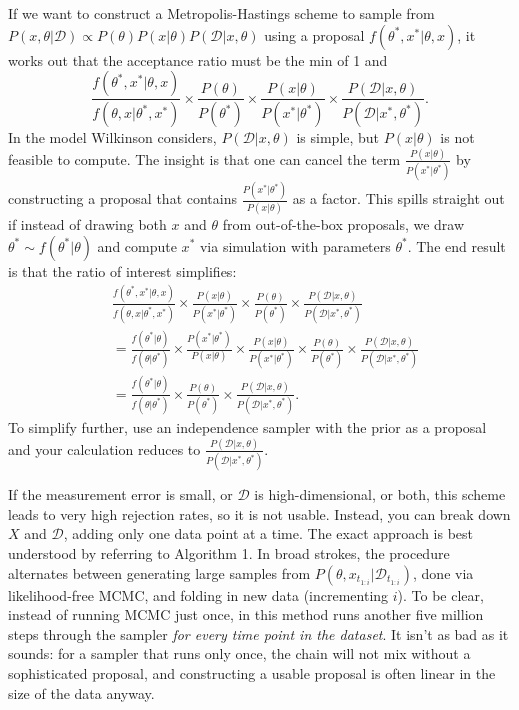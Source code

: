 \documentclass{article}
\begin{document}
If we want to construct a Metropolis-Hastings scheme to sample from $P(x, \theta|\mathcal{D})\propto P( \theta)P(x| \theta)P(\mathcal{D}|x, \theta)$ using a proposal $f(\theta^*, x^*|\theta, x)$, it works out that the acceptance ratio must be the min of 1 and $$\frac{f(\theta^*, x^*|\theta, x)}{f(\theta, x|\theta^*, x^*)}\times 
\frac{ P( \theta)}{ P( \theta^*)} \times 
\frac{P(x| \theta)}{P(x^*| \theta^*)} \times
 \frac{P(\mathcal{D}|x, \theta)}{P(\mathcal{D}|x^*, \theta^*)}.$$ 
In the model Wilkinson considers, $P(\mathcal{D}|x,\theta)$ is simple, but $P(x|\theta)$ is not feasible to compute. The insight is that one can cancel the term $ \frac{P(x| \theta)}{P(x^*| \theta^*)}$ by constructing a proposal that contains  $\frac{P(x^*| \theta^*)}{P(x| \theta)}$ as a factor. This spills straight out if instead of drawing both $x$ and $\theta$ from out-of-the-box proposals, we draw $\theta^*\sim f(\theta^*|\theta)$ and compute $x^*$ via simulation with parameters $\theta^*$. The end result is that the ratio of interest simplifies:
\begin{align*}
&\frac{f(\theta^*, x^*|\theta, x)}{f(\theta, x|\theta^*, x^*)}\times \frac{P(x| \theta)}{P(x^*| \theta^*)}\times \frac{ P( \theta)}{ P( \theta^*)}  \times \frac{P(\mathcal{D}|x, \theta)}{P(\mathcal{D}|x^*, \theta^*)}\\
&=\frac{f(\theta^*|\theta)}{f(\theta|\theta^*)}\times \frac{P(x^*| \theta^*)}{P(x| \theta)} \times \frac{P(x| \theta)}{P(x^*| \theta^*)} \times \frac{ P( \theta)}{ P( \theta^*)}\times \frac{P(\mathcal{D}|x, \theta)}{P(\mathcal{D}|x^*, \theta^*)}\\
&=\frac{f(\theta^*|\theta)}{f(\theta|\theta^*)}\times \frac{ P( \theta)}{ P( \theta^*)}\times \frac{P(\mathcal{D}|x, \theta)}{P(\mathcal{D}|x^*, \theta^*)}.
\end{align*}
To simplify further, use an independence sampler with the prior as a proposal and your calculation reduces to $ \frac{P(\mathcal{D}|x, \theta)}{P(\mathcal{D}|x^*, \theta^*)}.$

If the measurement error is small, or $\mathcal{D}$ is high-dimensional, or both, this scheme leads to very high rejection rates, so it is not usable. Instead, you can break down $X$ and $\mathcal{D}$, adding only one data point at a time. The exact approach is best understood by referring to Algorithm 1. In broad strokes, the procedure alternates between generating large samples from $P(\theta, x_{t_{1:i}}|\mathcal{D}_{t_{1:i}})$, done via  likelihood-free MCMC, and folding in new data (incrementing $i$). To be clear, instead of running MCMC just once, in this method runs another five million steps through the sampler {\it for every time point in the dataset}. It isn't as bad as it sounds: for a sampler that runs only once, the chain will not mix without a sophisticated proposal, and constructing a usable proposal is often linear in the size of the data anyway. %
 
\end{document}

